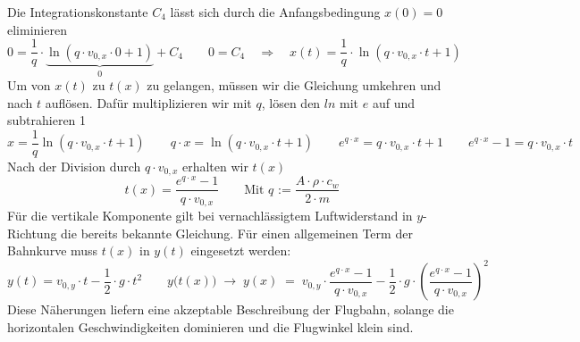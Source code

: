 Die Integrationskonstante $C_4$ lässt sich durch die Anfangsbedingung $x(0) = 0$ eliminieren
\[
0 = \frac{1}{q}\cdot \underbrace{\ln\left(q \cdot v_{0,x} \cdot 0+1\right)}_0 + C_4 \qquad 0 = C_4 \quad \Longrightarrow \quad x(t)=\frac{1}{q}\cdot \ln\left(q \cdot v_{0,x} \cdot t+1\right)
\]
Um von $x(t)$ zu $t(x)$ zu gelangen, müssen wir die Gleichung umkehren und nach $t$ auflösen. Dafür multiplizieren wir mit $q$, lösen den $ln$ mit $e$ auf und subtrahieren 1
\[
x = \frac{1}{q} \ln(q \cdot v_{0,x} \cdot t + 1) \qquad q \cdot x = \ln(q \cdot v_{0,x} \cdot t + 1) \qquad e^{q \cdot x} = q \cdot v_{0,x} \cdot t + 1 \qquad e^{q \cdot x} - 1 = q \cdot v_{0,x} \cdot t
\]
Nach der Division durch $q \cdot v_{0,x}$ erhalten wir $t(x)$
\[
t(x) = \frac{e^{q \cdot x} - 1}{q \cdot v_{0,x}} \qquad \text{Mit $q$ :=}\; {\frac{A \cdot \rho \cdot c_w}{2\cdot m}}
\]
Für die vertikale Komponente gilt bei vernachlässigtem Luftwiderstand in $y$-Richtung die bereits bekannte Gleichung. Für einen allgemeinen Term der Bahnkurve muss $t(x)$ in $y(t)$ eingesetzt werden:
\[
y(t)=v_{0,y}\cdot t-\frac{1}{2}\cdot g \cdot t^2 \qquad y\bigl(t(x)\bigl) \; \rightarrow \; y(x) \;= \;v_{0,y} \cdot \frac{e^{q \cdot x} - 1}{q \cdot v_{0,x}} - \frac{1}{2}\cdot g \cdot \left(\frac{e^{q \cdot x} - 1}{q \cdot v_{0,x}}\right)^2
\]
Diese Näherungen liefern eine akzeptable Beschreibung der Flugbahn, solange die horizontalen Geschwindigkeiten dominieren und die Flugwinkel klein sind.